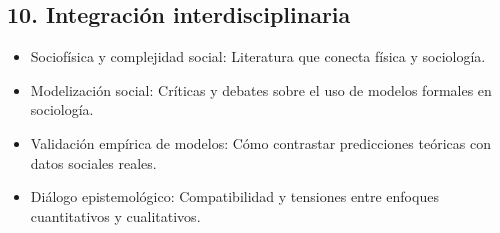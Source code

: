 \documentclass[a4paper,11pt]{article}
\begin{document}
\subsection*{10. Integración interdisciplinaria}
\begin{itemize}[leftmargin=*, label=--]
    \item Sociofísica y complejidad social: Literatura que conecta física y sociología.
    \item Modelización social: Críticas y debates sobre el uso de modelos formales en sociología.
    \item Validación empírica de modelos: Cómo contrastar predicciones teóricas con datos sociales reales.
    \item Diálogo epistemológico: Compatibilidad y tensiones entre enfoques cuantitativos y cualitativos.
\end{itemize}
\end{document}
